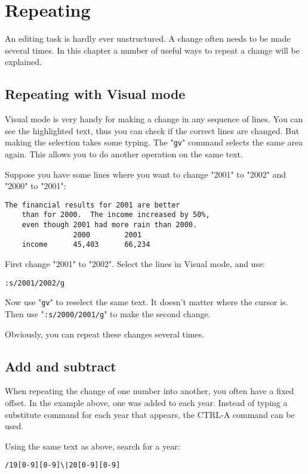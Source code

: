 \section{Repeating}
An editing task is hardly ever unstructured.
A change often needs to be made several times.
In this chapter a number of useful ways to repeat a change will be explained.
\subsection{Repeating with Visual mode}
Visual mode is very handy for making a change in any sequence of lines.
You can see the highlighted text, thus you can check if the correct lines are changed.
But making the selection takes some typing.
The "\verb!gv!" command selects the same area again.
This allows you to do another operation on the same text.

Suppose you have some lines where you want to change "2001" to "2002" and "2000" to "2001":

\begin{Verbatim}[samepage=true]
    The financial results for 2001 are better 
    than for 2000.  The income increased by 50%, 
    even though 2001 had more rain than 2000. 
                2000        2001 
    income      45,403      66,234 
\end{Verbatim}

First change "2001" to "2002".  Select the lines in Visual mode, and use:

\begin{Verbatim}[samepage=true]
 :s/2001/2002/g
\end{Verbatim}

Now use "\verb!gv!" to reselect the same text.
It doesn't matter where the cursor is.
Then use "\verb!:s/2000/2001/g!" to make the second change.

Obviously, you can repeat these changes several times.
\subsection{Add and subtract}
When repeating the change of one number into another, you often have a fixed offset.
In the example above, one was added to each year.
Instead of typing a substitute command for each year that appears, the CTRL-A command can be used.

Using the same text as above, search for a year:

\begin{Verbatim}[samepage=true]
 /19[0-9][0-9]\|20[0-9][0-9]
\end{Verbatim}

